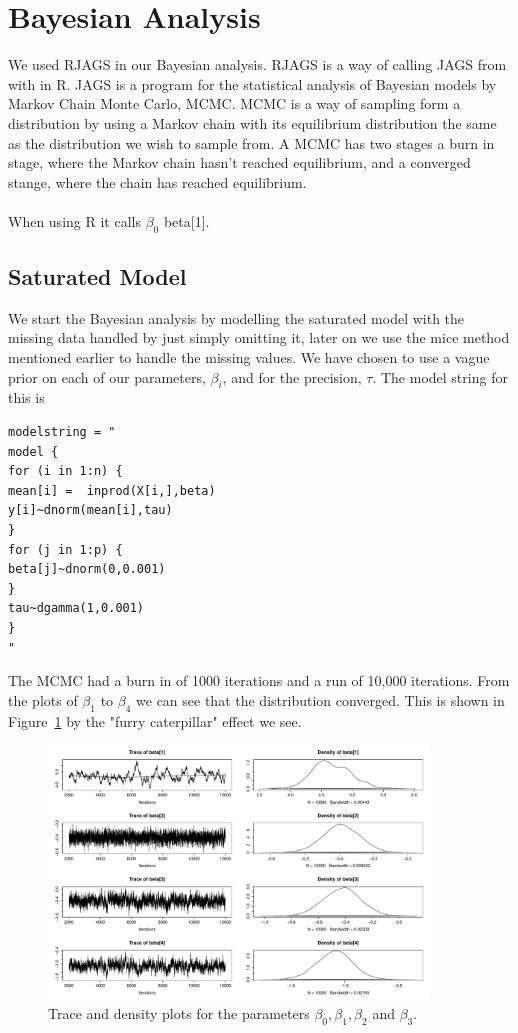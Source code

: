 \documentclass{article}
\begin{document}
\section{Bayesian Analysis}
We used RJAGS in our Bayesian analysis. RJAGS is a way of calling JAGS from with in \textsf{R}. JAGS is a program for the statistical analysis of Bayesian models by Markov Chain Monte Carlo, MCMC. MCMC is a way of sampling form a distribution by using a Markov chain with its equilibrium distribution the same as the distribution we wish to sample from. A MCMC has two stages a burn in stage, where the Markov chain hasn't reached equilibrium, and a converged stange, where the chain has reached equilibrium.
\\\\
When using \textsf{R} it calls $\beta_0$ beta[1].
\subsection{Saturated Model}
We start the Bayesian analysis by modelling the saturated model with the missing data handled by just simply omitting it, later on we use the mice method mentioned earlier to handle the missing values. We have chosen to use a vague prior on each of our parameters, $\beta_i$, and for the precision, $\tau$. The model string  for this is 
\begin{verbatim}
modelstring = "
model {
for (i in 1:n) {
mean[i] =  inprod(X[i,],beta)
y[i]~dnorm(mean[i],tau)
}
for (j in 1:p) {
beta[j]~dnorm(0,0.001)
}
tau~dgamma(1,0.001)
}
"
\end{verbatim}
The MCMC had a burn in of 1000 iterations and a run of 10,000 iterations. From the plots of $\beta_1$ to $\beta_4$ we can see that the distribution converged. This is shown in Figure~\ref{saturated_beta1-4} by the "furry caterpillar" effect we see.
\begin{figure}[h!]
\centering
\includegraphics[width = 0.9\textwidth]{saturatedOutput/beta1-4.pdf}
\caption{Trace and density plots for the parameters $\beta_0, \beta_1, \beta_2$ and $\beta_3$.}
\label{saturated_beta1-4}
\end{figure}
\end{document}
